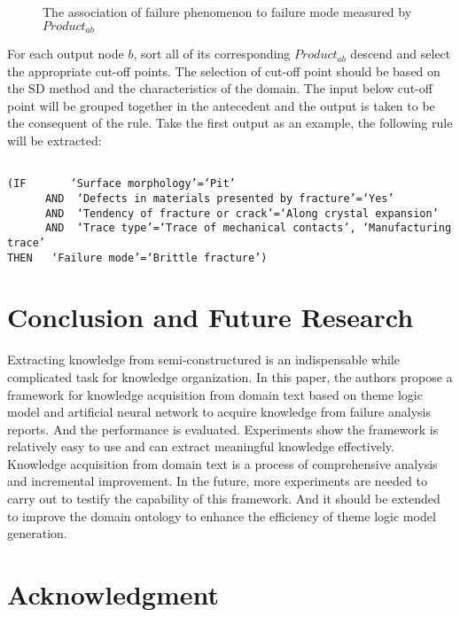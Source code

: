 \documentclass{elsart}
\begin{document}
 \begin{figure}[htb]
  \centering
  \caption{The association of failure phenomenon to failure mode measured by $Product_{ab}$
}
\label{fig:7}
\end{figure}

For each output node $b$, sort all of its corresponding $Product_{ab}$
descend and select the appropriate cut-off points. The selection of
cut-off point should be based on the SD method and the characteristics
of the domain. The input below cut-off point will be grouped together
in the antecedent and the output is taken to be the consequent of the
rule. Take the first output as an example, the following rule will be
extracted:
\begin{verbatim}

(IF       ‘Surface morphology’=‘Pit’ 
      AND  ‘Defects in materials presented by fracture’=‘Yes’
      AND  ‘Tendency of fracture or crack’=‘Along crystal expansion’
      AND  ‘Trace type’=‘Trace of mechanical contacts’, ‘Manufacturing trace’
THEN   ‘Failure mode’=‘Brittle fracture’)

\end{verbatim}

\section{Conclusion and Future Research 
}
\label{sec:concl-future-rese}

Extracting knowledge from semi-constructured is an indispensable while
complicated task for knowledge organization. In this paper, the authors
propose a framework for knowledge acquisition from domain text
based on theme logic model and artificial neural network to acquire knowledge from
failure analysis reports. And the  performance is evaluated. Experiments show the framework is relatively
easy to use and can extract meaningful knowledge effectively. 
Knowledge acquisition from domain text is a process of comprehensive
analysis and incremental improvement. In the future, more experiments are
needed to carry out to testify the capability of this framework. And
it should be extended to improve the domain ontology to enhance the
efficiency of theme logic model generation.

\section{Acknowledgment}
\label{sec:acknowledgment}
\end{document}
